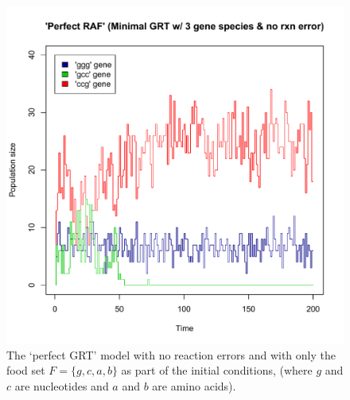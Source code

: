 \documentclass{article}
\begin{document}
{\begin{figure}
    \centering
    	\includegraphics[width=4.5in]{PerfectRAF(minimalGRTnoError)_foodAsSpace(simTime5e4).pdf}
    \caption{The `perfect GRT' model with no reaction errors and with only the food set $F=\{g,c,a,b\}$ as part of the initial conditions, 
    (where $g$ and $c$ are nucleotides and $a$ and $b$ are amino acids).}
	\label{fig:foodAsSpace}
\end{figure}

}
\end{document}

